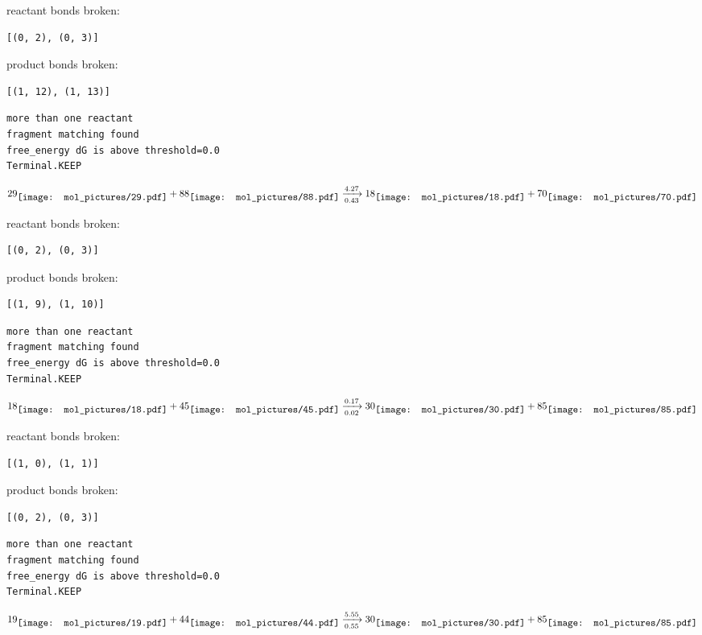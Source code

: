 \documentclass{article}
\begin{document}
reactant bonds broken:\begin{verbatim}
[(0, 2), (0, 3)]
\end{verbatim}
product bonds broken:\begin{verbatim}
[(1, 12), (1, 13)]
\end{verbatim}




\vspace{1cm}
\begin{verbatim}
more than one reactant
fragment matching found
free_energy dG is above threshold=0.0
Terminal.KEEP
\end{verbatim}
$$
29
\raisebox{-.5\height}{\texttt{[image: mol\_pictures/29.pdf]}}
+
88
\raisebox{-.5\height}{\texttt{[image: mol\_pictures/88.pdf]}}
\xrightarrow[0.43]{4.27}
18
\raisebox{-.5\height}{\texttt{[image: mol\_pictures/18.pdf]}}
+
70
\raisebox{-.5\height}{\texttt{[image: mol\_pictures/70.pdf]}}
$$


reactant bonds broken:\begin{verbatim}
[(0, 2), (0, 3)]
\end{verbatim}
product bonds broken:\begin{verbatim}
[(1, 9), (1, 10)]
\end{verbatim}




\vspace{1cm}
\begin{verbatim}
more than one reactant
fragment matching found
free_energy dG is above threshold=0.0
Terminal.KEEP
\end{verbatim}
$$
18
\raisebox{-.5\height}{\texttt{[image: mol\_pictures/18.pdf]}}
+
45
\raisebox{-.5\height}{\texttt{[image: mol\_pictures/45.pdf]}}
\xrightarrow[0.02]{0.17}
30
\raisebox{-.5\height}{\texttt{[image: mol\_pictures/30.pdf]}}
+
85
\raisebox{-.5\height}{\texttt{[image: mol\_pictures/85.pdf]}}
$$


reactant bonds broken:\begin{verbatim}
[(1, 0), (1, 1)]
\end{verbatim}
product bonds broken:\begin{verbatim}
[(0, 2), (0, 3)]
\end{verbatim}




\vspace{1cm}
\begin{verbatim}
more than one reactant
fragment matching found
free_energy dG is above threshold=0.0
Terminal.KEEP
\end{verbatim}
$$
19
\raisebox{-.5\height}{\texttt{[image: mol\_pictures/19.pdf]}}
+
44
\raisebox{-.5\height}{\texttt{[image: mol\_pictures/44.pdf]}}
\xrightarrow[0.55]{5.55}
30
\raisebox{-.5\height}{\texttt{[image: mol\_pictures/30.pdf]}}
+
85
\raisebox{-.5\height}{\texttt{[image: mol\_pictures/85.pdf]}}
$$
\end{document}
